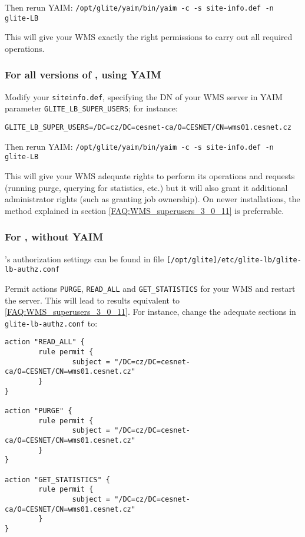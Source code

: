 Then rerun YAIM: 
\texttt{/opt/glite/yaim/bin/yaim -c -s site-info.def -n glite-LB}

 This will give your WMS exactly the right permissions to carry out all required operations.

\subsubsection{For all versions of \LB, using YAIM}

Modify your \texttt{siteinfo.def}, specifying the DN of your WMS server in YAIM parameter \texttt{GLITE\_LB\_SUPER\_USERS}; for instance:

\begin{center}
\texttt{GLITE\_LB\_SUPER\_USERS=/DC=cz/DC=cesnet-ca/O=CESNET/CN=wms01.cesnet.cz}
\end{center}

Then rerun YAIM: 
\texttt{/opt/glite/yaim/bin/yaim -c -s site-info.def -n glite-LB}

This will give your WMS adequate rights to perform its operations and requests (running purge, querying for statistics, etc.) but it will also grant it additional administrator rights (such as granting job ownership). On newer installations, the method explained in section \ref{FAQ:WMS_superusers_3_0_11} is preferrable.

\subsubsection{For , without YAIM}

\LB{}'s authorization settings can be found in file \texttt{[/opt/glite]/etc/glite-lb/glite-lb-authz.conf}

Permit actions \texttt{PURGE}, \texttt{READ\_ALL} and \texttt{GET\_STATISTICS} for your WMS and restart the \LB server.
This will lead to results equivalent to \ref{FAQ:WMS_superusers_3_0_11}.
For instance, change the adequate sections in \texttt{glite-lb-authz.conf} to:

\begin{verbatim}
action "READ_ALL" {
        rule permit {
                subject = "/DC=cz/DC=cesnet-ca/O=CESNET/CN=wms01.cesnet.cz"
        }
}

action "PURGE" {
        rule permit {
                subject = "/DC=cz/DC=cesnet-ca/O=CESNET/CN=wms01.cesnet.cz"
        }
}

action "GET_STATISTICS" {
        rule permit {
                subject = "/DC=cz/DC=cesnet-ca/O=CESNET/CN=wms01.cesnet.cz"
        }
}
\end{verbatim}

